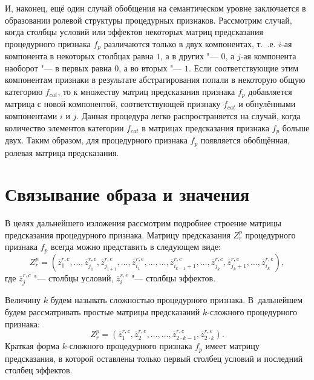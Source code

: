 \documentclass[a4paper, 12pt]{article}
\theoremstyle{plain}
\begin{document}
	И, наконец, ещё один случай обобщения на семантическом уровне заключается в образовании ролевой структуры процедурных признаков. Рассмотрим случай, когда столбцы условий или эффектов некоторых матриц предсказания процедурного признака $f_p$ различаются только в двух компонентах, т.~.е. $i$-ая компонента в некоторых столбцах равна $1$, а в других "--- $0$, а $j$-ая компонента наоборот "--- в первых равна $0$, а во вторых "--- $1$. Если соответствующие этим компонентам признаки в результате абстрагирования попали в некоторую общую категорию $f_{cat}$, то к множеству матриц предсказания признака $f_p$ добавляется матрица с новой компонентой, соответствующей признаку $f_{cat}$ и обнулёнными компонентами $i$ и $j$. Данная процедура легко распространяется на случай, когда количество элементов категории $f_{cat}$ в матрицах предсказания признака $f_p$ больше двух. Таким образом, для процедурного признака $f_p$ появляется обобщённая, ролевая матрица предсказания.

	\section{Связывание образа и значения}
	В целях дальнейшего изложения рассмотрим подробнее строение матрицы предсказания процедурного признака. Матрицу предсказания $Z_r^p$ процедурного признака $f_p$ всегда можно представить в следующем виде:
	\begin{equation}
	Z_r^p=(\bar z_1^{r,c},\dots,\bar z_{j_1}^{r,c},\bar z_{j_{1+1}}^{r,e},\dots,\bar z_{i_1}^{r,e},\dots,\dots,\bar z_{i_{k-1}+1}^{r,c},\dots,\bar z_{j_k}^{r,c},\bar z_{j_k+1}^{r,e},\dots,\bar z_{i_k}^{r,e}),
	\end{equation}
	где $\bar z_j^{r,c}$ "--- столбцы условий, $\bar z_i^{r,e}$ "--- столбцы эффектов. 
	
	Величину $k$ будем называть сложностью процедурного признака. В~дальнейшем будем рассматривать простые матрицы предсказаний $k$-сложного процедурного признака:
	\begin{equation}
	Z_r^p=(\bar z_1^{r,c},\bar z_2^{r,e},\dots,\dots,\bar z_{2\cdot k-1}^{r,c},\bar z_{2\cdot k}^{r,e}).
	\end{equation}
	Краткая форма $k$-сложного процедурного признака $f_p$ имеет матрицу предсказания, в которой оставлены только первый столбец условий и последний столбец эффектов.
	
\end{document}
